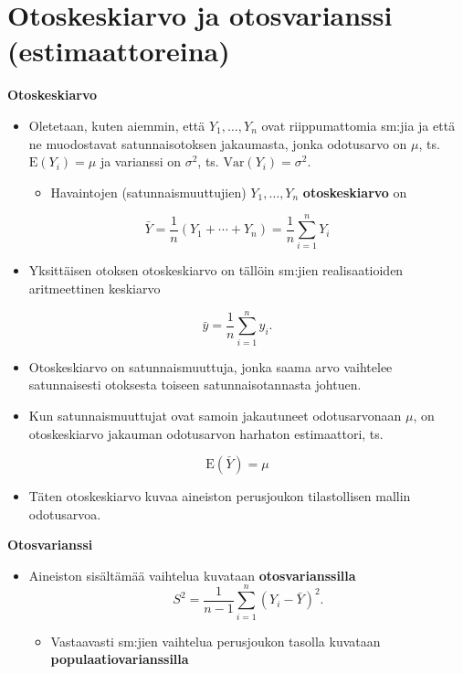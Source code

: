 \documentclass[
]{book}
\providecommand{\tightlist}{%
  \setlength{\itemsep}{0pt}\setlength{\parskip}{0pt}}
\begin{document}
\hypertarget{alaluku84}{%
\section{Otoskeskiarvo ja otosvarianssi (estimaattoreina)}\label{alaluku84}}

\textbf{Otoskeskiarvo}

\begin{itemize}
\tightlist
\item
  Oletetaan, kuten aiemmin, että \(Y_1,\ldots,Y_n\) ovat riippumattomia sm:jia ja että ne muodostavat satunnaisotoksen jakaumasta, jonka odotusarvo on \(\mu\), ts. \(\text{E}(Y_i) = \mu\) ja varianssi on \(\sigma^2\), ts. \(\text{Var}(Y_i) = \sigma^2\).

  \begin{itemize}
  \tightlist
  \item
    Havaintojen (satunnaismuuttujien) \(Y_1, \ldots, Y_n\) \textbf{otoskeskiarvo} on
  \end{itemize}
\end{itemize}

\[
\bar{Y} = \frac{1}{n}(Y_1 + \cdots + Y_n) = \frac{1}{n} \sum_{i=1}^{n} Y_i
\]

\begin{itemize}
\tightlist
\item
  Yksittäisen otoksen otoskeskiarvo on tällöin sm:jien realisaatioiden aritmeettinen keskiarvo
\end{itemize}

\[
\bar{y} = \frac{1}{n} \sum_{i=1}^{n} y_i.
\]

\begin{itemize}
\tightlist
\item
  Otoskeskiarvo on satunnaismuuttuja, jonka saama arvo vaihtelee satunnaisesti otoksesta toiseen satunnaisotannasta johtuen.
\item
  Kun satunnaismuuttujat ovat samoin jakautuneet odotusarvonaan \(\mu\), on otoskeskiarvo jakauman odotusarvon harhaton estimaattori, ts.
\end{itemize}

\[\text{E}(\bar{Y}) = \mu\]

\begin{itemize}
\tightlist
\item
  Täten otoskeskiarvo kuvaa aineiston perusjoukon tilastollisen mallin odotusarvoa.
\end{itemize}

\textbf{Otosvarianssi}

\begin{itemize}
\item
  Aineiston sisältämää vaihtelua kuvataan \textbf{otosvarianssilla}
  \[
  S^2= \frac{1}{n-1} \sum_{i=1}^{n} (Y_i - \bar{Y})^2.
  \]

  \begin{itemize}
  \tightlist
  \item
    Vastaavasti sm:jien vaihtelua perusjoukon tasolla kuvataan \textbf{populaatiovarianssilla}
  \end{itemize}
\end{itemize}
\end{document}

